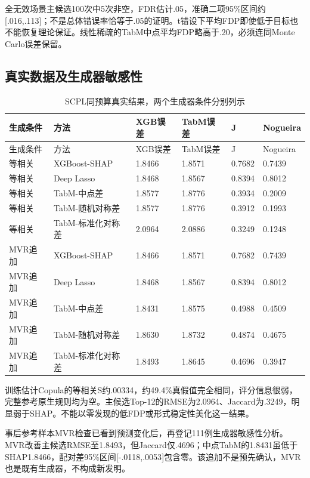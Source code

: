 \documentclass[UTF8,11pt,a4paper]{ctexart}
\begin{document}
全无效场景主候选100次中5次非空，FDR估计.05，准确二项95\%区间约{[}.016,.113{]}；不是总体错误率恰等于.05的证明。t错设下平均FDP即使低于目标也不能恢复理论保证。线性稀疏的TabM中点平均FDP略高于.20，必须连同Monte Carlo误差保留。

\subsection{真实数据及生成器敏感性}

{
\footnotesize
\begin{longtable}[]{@{}llllll@{}}
\caption{SCPL同预算真实结果，两个生成器条件分别列示}\tabularnewline
\toprule\noalign{}
生成条件 & 方法 & XGB误差 & TabM误差 & J & Nogueira \\
\midrule\noalign{}
\endfirsthead
\toprule\noalign{}
生成条件 & 方法 & XGB误差 & TabM误差 & J & Nogueira \\
\midrule\noalign{}
\endhead
\bottomrule\noalign{}
\endlastfoot
等相关 & XGBoost-SHAP & 1.8466 & 1.8571 & 0.7682 & 0.7439 \\
等相关 & Deep Lasso & 1.8468 & 1.8567 & 0.8394 & 0.8012 \\
等相关 & TabM-中点差 & 1.8577 & 1.8776 & 0.3934 & 0.2009 \\
等相关 & TabM-随机对称差 & 1.8577 & 1.8776 & 0.3912 & 0.1993 \\
等相关 & TabM-标准化对称差 & 2.0964 & 2.0886 & 0.3249 & 0.1248 \\
MVR追加 & XGBoost-SHAP & 1.8466 & 1.8571 & 0.7682 & 0.7439 \\
MVR追加 & Deep Lasso & 1.8468 & 1.8567 & 0.8394 & 0.8012 \\
MVR追加 & TabM-中点差 & 1.8431 & 1.8575 & 0.4988 & 0.4509 \\
MVR追加 & TabM-随机对称差 & 1.8630 & 1.8732 & 0.4874 & 0.4675 \\
MVR追加 & TabM-标准化对称差 & 1.8493 & 1.8645 & 0.4696 & 0.3947 \\
\end{longtable}
}

训练估计Copula的等相关S约.00334，约49.4\%真假值完全相同，评分信息很弱，完整参考原生规则均为空。主候选Top-12的RMSE为2.0964、Jaccard为.3249，明显弱于SHAP。不能以零发现的低FDP或形式稳定性美化这一结果。

事后参考样本MVR检查已看到预测变化后，再登记111例生成器敏感性分析。MVR改善主候选RMSE至1.8493，但Jaccard仅.4696；中点TabM的1.8431虽低于SHAP1.8466，配对差95\%区间{[}-.0118,.0053{]}包含零。该追加不是预先确认，MVR也是既有生成器，不构成新发明。
\end{document}
